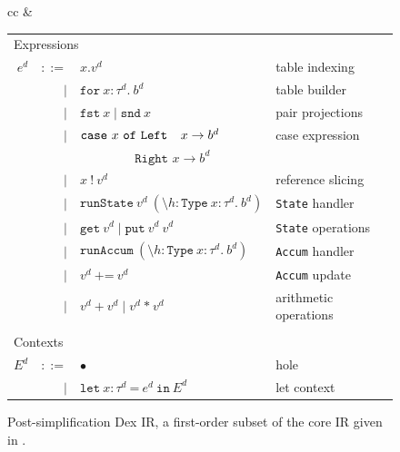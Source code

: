 \documentclass[acmsmall,screen,nonacm]{acmart}
\newcommand{\ttt}[1]{\texttt{#1}}
\newcommand{\letx}[3]{\ttt{let}~#1~\ttt{=}~#2~\ttt{in}~#3}
\newcommand{\forexpr}[3]{\ttt{for}~#1\!:\!#2 .~ #3}
\newcommand{\case}[3]{\ttt{case}~#1~\ttt{of}~
                         \ttt{Left  $x$} \rightarrow #2;~
                         \ttt{Right $x$} \rightarrow #3}
\newcommand{\ann}{\!:\!}
\newcommand{\action}[4]{\ttt{\textbackslash}#1\ann\ttt{Type}~#2\ann#3\ttt{.}~#4}
\begin{document}
\begin{figure}[t]
\begin{tabular}{cc}
&%
\begin{tabular}{r@{~~}r@{~~}ll}
  \multicolumn{3}{l}{Expressions} \\
  $e^d$ & $::=$
           & $x.v^d$                 & table indexing \\
  & $\mid$ & $\forexpr x {\tau^d} b^d$   & table builder \\
  & $\mid$ & $\ttt{fst}~x \mid \ttt{snd}~x$       & pair projections \\
  & $\mid$ & $\ttt{case}~x~\ttt{of}~
                         \ttt{Left\phantom{-} $x$} \rightarrow b^d$         & case expression \\
  & & $\phantom{\ttt{case}~v~\ttt{of}~}
                         \ttt{Right $x$} \rightarrow b^d$         &\\
  & $\mid$ & $x~!~v^d$               & reference slicing \\
  & $\mid$ & $\ttt{runState}~v^d~(\action h x {\tau^d} b^d)$   & \ttt{State} handler \\
  & $\mid$ & $\ttt{get}~v^d \mid \ttt{put}~v^d~v^d$   & \ttt{State} operations \\
  & $\mid$ & $\ttt{runAccum}~(\action h x {\tau^d} b^d)$   & \ttt{Accum} handler \\
  & $\mid$ & $v^d~\ttt{+=}~v^d$   & \ttt{Accum} update \\
  & $\mid$ & $v^d~\ttt{+}~v^d \mid v^d~\ttt{*}~v^d$ & arithmetic operations \\
  \\
  \multicolumn{3}{l}{Contexts} \\
  $E^d$ & $::=$
           & $\bullet$  & hole\\
  & $\mid$ & $\letx {x:\tau^d} {e^d} E^d$  & let context \\
\end{tabular}
\end{tabular}
\caption{Post-simplification Dex IR, a first-order subset of the core IR given in .}
\label{fig:defunctionalized-language}
\end{figure}
\end{document}
